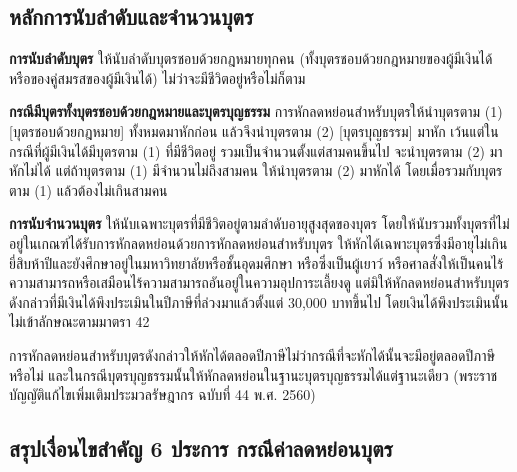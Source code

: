 \documentclass[12pt,a4paper]{article}
\begin{document}
\subsection*{หลักการนับลำดับและจำนวนบุตร}

\textbf{การนับลำดับบุตร} ให้นับลำดับบุตรชอบด้วยกฎหมายทุกคน (ทั้งบุตรชอบด้วยกฎหมายของผู้มีเงินได้หรือของคู่สมรสของผู้มีเงินได้) ไม่ว่าจะมีชีวิตอยู่หรือไม่ก็ตาม

\textbf{กรณีมีบุตรทั้งบุตรชอบด้วยกฎหมายและบุตรบุญธรรม} การหักลดหย่อนสำหรับบุตรให้นำบุตรตาม (1) [บุตรชอบด้วยกฎหมาย] ทั้งหมดมาหักก่อน แล้วจึงนำบุตรตาม (2) [บุตรบุญธรรม] มาหัก เว้นแต่ในกรณีที่ผู้มีเงินได้มีบุตรตาม (1) ที่มีชีวิตอยู่ รวมเป็นจำนวนตั้งแต่สามคนขึ้นไป จะนำบุตรตาม (2) มาหักไม่ได้ แต่ถ้าบุตรตาม (1) มีจำนวนไม่ถึงสามคน ให้นำบุตรตาม (2) มาหักได้ โดยเมื่อรวมกับบุตรตาม (1) แล้วต้องไม่เกินสามคน

\textbf{การนับจำนวนบุตร} ให้นับเฉพาะบุตรที่มีชีวิตอยู่ตามลำดับอายุสูงสุดของบุตร โดยให้นับรวมทั้งบุตรที่ไม่อยู่ในเกณฑ์ได้รับการหักลดหย่อนด้วยการหักลดหย่อนสำหรับบุตร ให้หักได้เฉพาะบุตรซึ่งมีอายุไม่เกินยี่สิบห้าปีและยังศึกษาอยู่ในมหาวิทยาลัยหรือชั้นอุดมศึกษา หรือซึ่งเป็นผู้เยาว์ หรือศาลสั่งให้เป็นคนไร้ความสามารถหรือเสมือนไร้ความสามารถอันอยู่ในความอุปการะเลี้ยงดู แต่มิให้หักลดหย่อนสำหรับบุตรดังกล่าวที่มีเงินได้พึงประเมินในปีภาษีที่ล่วงมาแล้วตั้งแต่ 30,000 บาทขึ้นไป โดยเงินได้พึงประเมินนั้นไม่เข้าลักษณะตามมาตรา 42

การหักลดหย่อนสำหรับบุตรดังกล่าวให้หักได้ตลอดปีภาษีไม่ว่ากรณีที่จะหักได้นั้นจะมีอยู่ตลอดปีภาษีหรือไม่ และในกรณีบุตรบุญธรรมนั้นให้หักลดหย่อนในฐานะบุตรบุญธรรมได้แต่ฐานะเดียว (พระราชบัญญัติแก้ไขเพิ่มเติมประมวลรัษฎากร ฉบับที่ 44 พ.ศ. 2560)

\subsection*{สรุปเงื่อนไขสำคัญ 6 ประการ กรณีค่าลดหย่อนบุตร}
\end{document}
